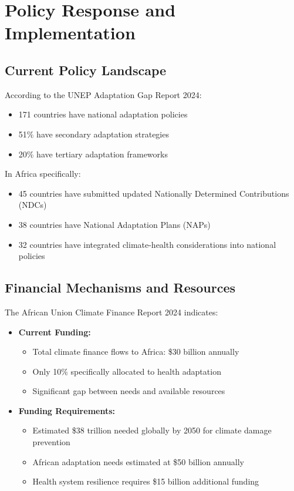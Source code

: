 \section{Policy Response and Implementation}
\label{sec:policy_response}

\subsection{Current Policy Landscape}
According to the UNEP Adaptation Gap Report 2024:

\begin{itemize}
    \item 171 countries have national adaptation policies
    \item 51\% have secondary adaptation strategies
    \item 20\% have tertiary adaptation frameworks
\end{itemize}

In Africa specifically:
\begin{itemize}
    \item 45 countries have submitted updated Nationally Determined Contributions (NDCs)
    \item 38 countries have National Adaptation Plans (NAPs)
    \item 32 countries have integrated climate-health considerations into national policies
\end{itemize}

\subsection{Financial Mechanisms and Resources}
The African Union Climate Finance Report 2024 indicates:

\begin{itemize}
    \item \textbf{Current Funding:}
    \begin{itemize}
        \item Total climate finance flows to Africa: \$30 billion annually
        \item Only 10\% specifically allocated to health adaptation
        \item Significant gap between needs and available resources
    \end{itemize}
    
    \item \textbf{Funding Requirements:}
    \begin{itemize}
        \item Estimated \$38 trillion needed globally by 2050 for climate damage prevention
        \item African adaptation needs estimated at \$50 billion annually
        \item Health system resilience requires \$15 billion additional funding
    \end{itemize}
\end{itemize}

